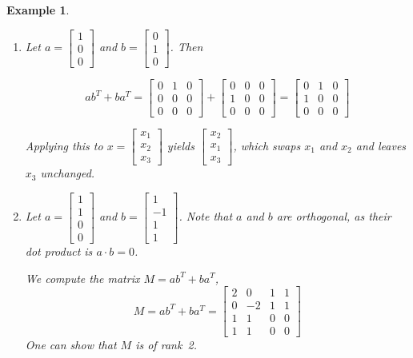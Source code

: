 \documentclass[dvipsnames, 12pt]{article}
\newtheorem{Example}[Theorem]{Example}
\begin{document}
\begin{Example}
    \label{example04}
    \begin{enumerate}
        \item Let $a = \begin{bmatrix} 1 \\ 0 \\ 0 \end{bmatrix}$       and $b = \begin{bmatrix} 0 \\ 1 \\ 0\end{bmatrix}$. Then

            $$
            ab^T + ba^T = \begin{bmatrix} 0 & 1 & 0 \\ 0 & 0 & 0 \\ 0 & 0 & 0 \end{bmatrix} + \begin{bmatrix} 0 & 0 & 0 \\ 1 & 0 & 0 \\ 0 & 0 & 0 \end{bmatrix} = \begin{bmatrix} 0 & 1 & 0 \\ 1 & 0 & 0 \\ 0 & 0 & 0 \end{bmatrix} 
            $$
            
            Applying this to $x = \begin{bmatrix} x_1 \\ x_2 \\ x_3 \end{bmatrix}$ yields $\begin{bmatrix} x_2 \\ x_1 \\ x_3 \end{bmatrix}$, which swaps $x_1$ and $x_2$ and leaves $x_3$ unchanged.


        \item Let $a = \begin{bmatrix} 1 \\ 1 \\ 0 \\ 0 \end{bmatrix}$ and $b = \begin{bmatrix} 1 \\ -1 \\ 1 \\ 1 \end{bmatrix}$.  Note that $a$ and $b$ are orthogonal, as their dot product is $a \cdot b = 0$.

            We compute the matrix $M = ab^T + ba^T$,
            $$
            M = ab^T + ba^T = \begin{bmatrix} 2 & 0 & 1 & 1 \\ 0 & -2 & 1 & 1 \\ 1 & 1 & 0 & 0 \\ 1 & 1 & 0 & 0 \end{bmatrix} 
            $$
            One can show that $M$ is of rank~2.
    \end{enumerate}
\end{Example}
\end{document}

